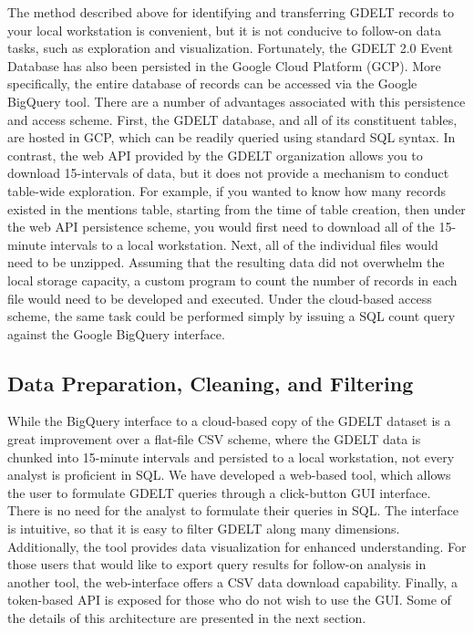 \documentclass[preprint,authoryear,12pt]{elsarticle/elsarticle}
\begin{document}
The method described above for identifying and transferring GDELT records to your local workstation is convenient, but it is not conducive to follow-on data tasks, such as exploration and visualization. Fortunately, the GDELT 2.0 Event Database has also been persisted in the Google Cloud Platform (GCP). More specifically, the entire database of records can be accessed via the Google BigQuery tool. There are a number of advantages associated with this persistence and access scheme. First, the GDELT database, and all of its constituent tables, are hosted in GCP, which can be readily queried using standard SQL syntax. In contrast, the web API provided by the GDELT organization allows you to download 15-intervals of data, but it does not provide a mechanism to conduct table-wide exploration. For example, if you wanted to know how many records existed in the mentions table, starting from the time of table creation, then under the web API persistence scheme, you would first need to download all of the 15-minute intervals to a local workstation. Next, all of the individual files would need to be unzipped. Assuming that the resulting data did not overwhelm the local storage capacity, a custom program to count the number of records in each file would need to be developed and executed. Under the cloud-based access scheme, the same task could be performed simply by issuing a SQL count query against the Google BigQuery interface. 

\subsection{Data Preparation, Cleaning, and Filtering}
While the BigQuery interface to a cloud-based copy of the GDELT dataset is a great improvement over a flat-file CSV scheme, where the GDELT data is chunked into 15-minute intervals and persisted to a local workstation, not every analyst is proficient in SQL. We have developed a web-based tool, which allows the user to formulate GDELT queries through a click-button GUI interface. There is no need for the analyst to formulate their queries in SQL. The interface is intuitive, so that it is easy to filter GDELT along many dimensions. Additionally, the tool provides data visualization for enhanced understanding. For those users that would like to export query results for follow-on analysis in another tool, the web-interface offers a CSV data download capability. Finally, a token-based API is exposed for those who do not wish to use the GUI. Some of the details of this architecture are presented in the next section.
\end{document}
